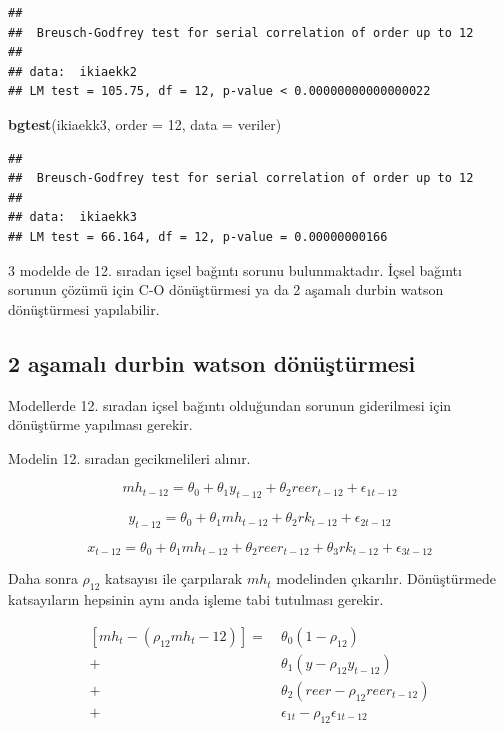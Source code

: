 \documentclass[]{article}
\newenvironment{Shaded}{\begin{snugshade}}{\end{snugshade}}
\newcommand{\KeywordTok}[1]{\textcolor[rgb]{0.13,0.29,0.53}{\textbf{#1}}}
\newcommand{\DataTypeTok}[1]{\textcolor[rgb]{0.13,0.29,0.53}{#1}}
\newcommand{\DecValTok}[1]{\textcolor[rgb]{0.00,0.00,0.81}{#1}}
\newcommand{\NormalTok}[1]{#1}
\begin{document}
\begin{verbatim}
## 
##  Breusch-Godfrey test for serial correlation of order up to 12
## 
## data:  ikiaekk2
## LM test = 105.75, df = 12, p-value < 0.00000000000000022
\end{verbatim}

\begin{Shaded}
\begin{Highlighting}[]
\KeywordTok{bgtest}\NormalTok{(ikiaekk3, }\DataTypeTok{order =} \DecValTok{12}\NormalTok{, }\DataTypeTok{data =}\NormalTok{ veriler)}
\end{Highlighting}
\end{Shaded}

\begin{verbatim}
## 
##  Breusch-Godfrey test for serial correlation of order up to 12
## 
## data:  ikiaekk3
## LM test = 66.164, df = 12, p-value = 0.00000000166
\end{verbatim}

3 modelde de 12. sıradan içsel bağıntı sorunu bulunmaktadır. İçsel
bağıntı sorunun çözümü için C-O dönüştürmesi ya da 2 aşamalı durbin
watson dönüştürmesi yapılabilir.

\subsection{2 aşamalı durbin watson
dönüştürmesi}\label{asamal-durbin-watson-donusturmesi}

Modellerde 12. sıradan içsel bağıntı olduğundan sorunun giderilmesi için
dönüştürme yapılması gerekir.

Modelin 12. sıradan gecikmelileri alınır.

\[mh_{t-12}=\theta_0+\theta_1y_{t-12}+\theta_2reer_{t-12}+\epsilon_{1t-12}\]

\[y_{t-12}=\theta_0+\theta_1mh_{t-12}+\theta_2rk_{t-12}+\epsilon_{2t-12}\]

\[x_{t-12}=\theta_0+\theta_1mh_{t-12}+\theta_2reer_{t-12}+\theta_3rk_{t-12}+\epsilon_{3t-12}\]

Daha sonra \(\rho_12\) katsayısı ile çarpılarak \(mh_t\) modelinden
çıkarılır. Dönüştürmede katsayıların hepsinin aynı anda işleme tabi
tutulması gerekir.

\[
\begin{aligned}
[mh_t-(\rho_12mh_t-{12})] =&\ \theta_0(1-\rho_{12})\\[1.5em]
+&\ \theta_1(y-\rho_{12}y_{t-12})\\[1.5em]
+&\ \theta_2(reer-\rho_{12}reer_{t-12})\\[1.5em]
+&\ \epsilon_{1t} - \rho_{12}\epsilon_{1t-12}
\end{aligned}
\]
\end{document}
